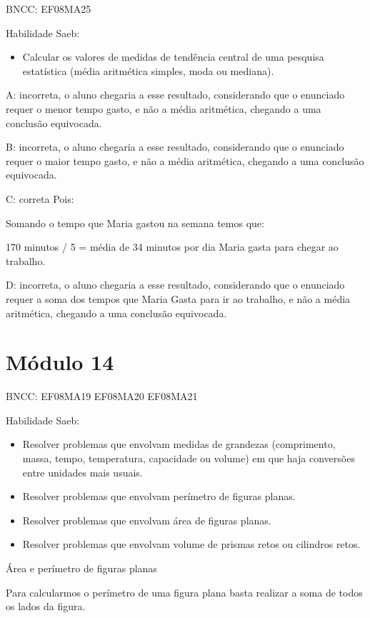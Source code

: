 BNCC: EF08MA25

Habilidade Saeb:

\begin{itemize}
\tightlist
\item
  Calcular os valores de medidas de tendência central de uma pesquisa
  estatística (média aritmética simples, moda ou mediana).
\end{itemize}

A: incorreta, o aluno chegaria a esse resultado, considerando que o
enunciado requer o menor tempo gasto, e não a média aritmética, chegando
a uma conclusão equivocada.

B: incorreta, o aluno chegaria a esse resultado, considerando que o
enunciado requer o maior tempo gasto, e não a média aritmética, chegando
a uma conclusão equivocada.

C: correta Pois:

Somando o tempo que Maria gastou na semana temos que:

170 minutos / 5 = média de 34 minutos por dia Maria gasta para chegar ao
trabalho.

D: incorreta, o aluno chegaria a esse resultado, considerando que o
enunciado requer a soma dos tempos que Maria Gasta para ir ao trabalho,
e não a média aritmética, chegando a uma conclusão equivocada.

\hypertarget{muxf3dulo-14}{%
\section{Módulo 14}\label{muxf3dulo-14}}

BNCC: EF08MA19 EF08MA20 EF08MA21

Habilidade Saeb:

\begin{itemize}
\item
  Resolver problemas que envolvam medidas de grandezas (comprimento,
  massa, tempo, temperatura, capacidade ou volume) em que haja
  conversões entre unidades mais usuais.
\item
  Resolver problemas que envolvam perímetro de figuras planas.
\item
  Resolver problemas que envolvam área de figuras planas.
\item
  Resolver problemas que envolvam volume de prismas retos ou cilindros
  retos.
\end{itemize}

Área e perímetro de figuras planas

Para calcularmos o perímetro de uma figura plana basta realizar a soma
de todos os lados da figura.

